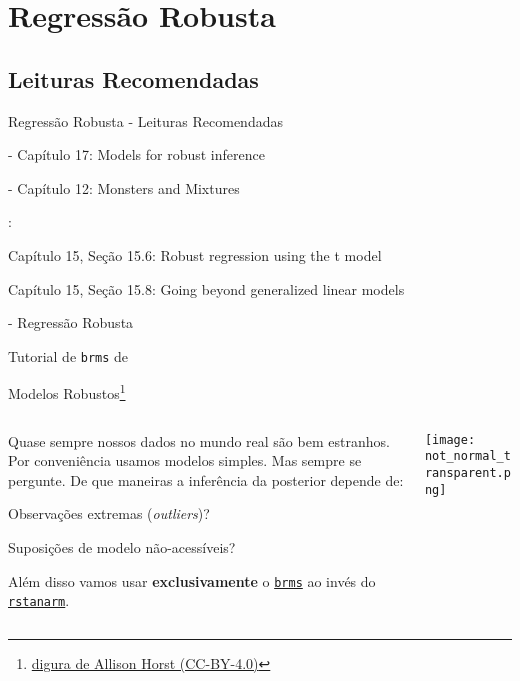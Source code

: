 \section{Regressão Robusta}

\subsection{Leituras Recomendadas}
\begin{frame}{Regressão Robusta - Leituras Recomendadas}
	\begin{vfilleditems}
		\item \textcite{gelman2013bayesian} - Capítulo 17: Models for robust inference
		\item \textcite{mcelreath2020statistical} - Capítulo 12: Monsters and Mixtures
		\item \textcite{gelman2020regression}:
		\begin{vfilleditems}
			\item Capítulo 15, Seção 15.6: Robust regression using the t model
			\item Capítulo 15, Seção 15.8: Going beyond generalized linear models
		\end{vfilleditems}
		\item \textcite{storopoli2021estatisticabayesianaR} - Regressão Robusta
		\item Tutorial de \texttt{brms} de \textcite{burknerAdvancedBayesianMultilevel2018}
	\end{vfilleditems}
\end{frame}

\begin{frame}{Modelos Robustos\footnote{\href{https://github.com/allisonhorst/stats-illustrations}{digura de Allison Horst (CC-BY-4.0)}}}
	\begin{columns}
		\begin{column}{0.6\textwidth}
			Quase sempre nossos dados no mundo real são bem estranhos.
			\vfill
			Por conveniência usamos modelos simples. Mas sempre se
			pergunte. De que maneiras a inferência da posterior depende de:
			\vfill
			\begin{vfilleditems}
				\item Observações extremas (\textit{outliers})?
				\item Suposições de modelo não-acessíveis?
			\end{vfilleditems}
			\vfill
			Além disso vamos usar \textbf{exclusivamente} o
			\href{https://paul-buerkner.github.io/brms/}{\texttt{brms}}
			ao invés do \href{http://mc-stan.org/rstanarm/}{\texttt{rstanarm}}.
		\end{column}
		\begin{column}{0.4\textwidth}
			\texttt{[image: not\_normal\_transparent.png]}
		\end{column}
	\end{columns}
\end{frame}

